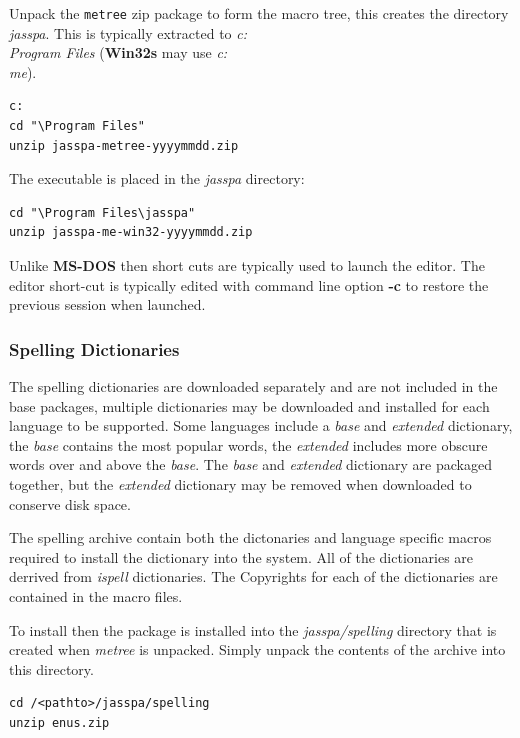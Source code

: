 \documentclass[11pt,a4paper,pdftex]{article}
\begin{document}
    Unpack the \texttt{metree} zip package to form the macro tree, this
    creates the directory \textit{jasspa}. This is typically extracted to
    \textit{c:\\Program Files} (\textbf{Win32s} may use \textit{c:\\me}).

\begin{verbatim}
c:
cd "\Program Files"
unzip jasspa-metree-yyyymmdd.zip
\end{verbatim}

    The executable is placed in the \textit{jasspa} directory:

\begin{verbatim}
cd "\Program Files\jasspa"
unzip jasspa-me-win32-yyyymmdd.zip
\end{verbatim}

    Unlike \textbf{MS-DOS} then short cuts are typically used to launch the
    editor. The editor short-cut is typically edited with command line option
    \textbf{-c} to restore the previous session when launched.

\subsubsection{Spelling Dictionaries}

    The spelling dictionaries are downloaded separately and are not included
    in the base packages, multiple dictionaries may be downloaded and
    installed for each language to be supported. Some languages include a
    \textit{base} and \textit{extended} dictionary, the \textit{base} contains
    the most popular words, the \textit{extended} includes more obscure words
    over and above the \textit{base}. The \textit{base} and \textit{extended}
    dictionary are packaged together, but the \textit{extended} dictionary may
    be removed when downloaded to conserve disk space.

    The spelling archive contain both the dictonaries and language specific
    macros required to install the dictionary into the system. All of the
    dictionaries are derrived from \textit{ispell} dictionaries. The
    Copyrights for each of the dictionaries are contained in the macro files.

    To install then the package is installed into the \textit{jasspa/spelling}
    directory that is created when \textit{metree} is unpacked. Simply unpack
    the contents of the archive into this directory.

\begin{verbatim}
cd /<pathto>/jasspa/spelling
unzip enus.zip
\end{verbatim}
\end{document}
